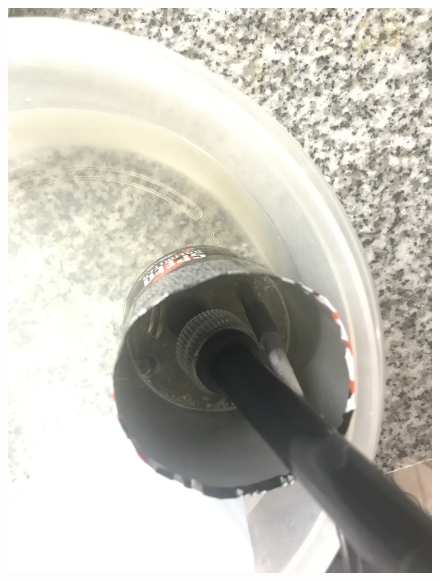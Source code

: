     \begin{figure}
        \centering
        \includegraphics[scale=0.1]{Anexo/FotosExperimentos/P8.jpg}
        \label{fig:MedicPH}
    \end{figure}
        
